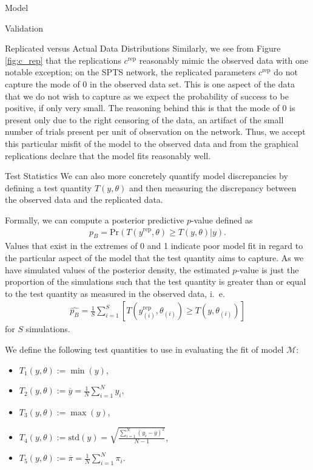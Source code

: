 \begin{chapter}{Model}
\begin{section}{Validation}
\begin{subsection}{Replicated versus Actual Data Distributions}
    Similarly, we see from Figure \ref{fig:c_rep} that the replications $c^{\text{rep}}$
    reasonably mimic the observed data with one notable exception; on the SPTS network,
    the replicated parameters $c^\text{rep}$ do not capture the mode of 0 in the observed data set.
    This is one aspect of the data that we do not wish to capture as we expect the probability
    of success to be positive, if only very small. The reasoning behind this is
    that the mode of 0 is present only due to the right censoring of the data, an artifact
    of the small number of trials present per unit of observation on the network. Thus, we accept this
    particular misfit of the model to the observed data and from the graphical replications
    declare that the model fits reasonably well.
  \end{subsection}

  \begin{subsection}{Test Statistics}\label{sec:test}
    We can also more concretely quantify model discrepancies by defining a test quantity $T(y, \theta)$
    and then measuring the discrepancy between the observed data and the replicated data.

    Formally, we can compute a posterior predictive $p$-value defined as
    \begin{align}\label{form:bayesp}
      p_B = \text{Pr}\left( T(y^{\text{rep}}, \theta) \geq T(y, \theta)  | y \right).
    \end{align}
    Values that exist in the extremes of 0 and 1 indicate poor model fit in regard to the particular
    aspect of the model that the test quantity aims to capture.
    As we have simulated values of the posterior density, the estimated $p$-value is
    just the proportion of the simulations such that the test quantity is greater than or equal
    to the test quantity as measured in the observed data, i.\ e.\
    \begin{align*}
      \hat{p_B} = \frac{1}{S}\sum_{i=1}^S [T(y_{(i)}^{\text{rep}}, \theta_{(i)}) \geq T(y, \theta_{(i)})]
    \end{align*}
    for $S$ simulations.

    We define the following test quantities to use in evaluating the fit of model $\mathcal{M}$:
    \begin{itemize}
      \item $T_1(y, \theta):= \min(y)$,
      \item $T_2(y, \theta):= \overline{y} = \frac{1}{N}\sum_{i=1}^N y_i$,
      \item $T_3(y, \theta):= \max(y)$,
      \item $T_4(y, \theta):= \text{std}(y) = \sqrt {\frac {\sum _{i=1}^{N}(y_{i}- \overline {y})^{2}}{N-1}}$,
      \item $T_5(y, \theta) := \overline{\pi} = \frac{1}{N}\sum_{i=1}^N \pi_i$.
    \end{itemize}


\end{subsection}
\end{section}
\end{chapter}
